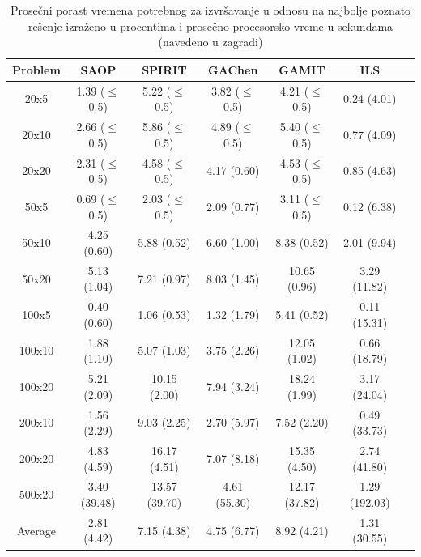 \documentclass[a4paper]{article}
\begin{document}
\begin{table}[H]
  \caption{Prosečni porast vremena potrebnog za izvršavanje u odnosu na najbolje poznato rešenje izraženo u procentima i prosečno procesorsko vreme u sekundama (navedeno u zagradi)
  \cite{aComprehensiveReviewAndEvaluationOfPermutationFlowshopHeuristics}}
  \label{tab:alg}
  \begin{center}
      \begin{adjustbox}{max width=1.0\linewidth,center}
   \begin{tabular}{c c c c c c c} 
   \hline
   Problem & SAOP & SPIRIT & GAChen & GAMIT & ILS &\\ [0.5ex] 
   \hline\hline
   20x5 & 1.39 ($\leq$0.5) & 5.22 ($\leq$0.5) & 3.82 ($\leq$0.5) & 4.21 ($\leq$0.5) & 0.24 (4.01) &\\ [1ex]
   \hline
   20x10 & 2.66 ($\leq$0.5) & 5.86 ($\leq$0.5) & 4.89 ($\leq$0.5) & 5.40 ($\leq$0.5) & 0.77 (4.09) &\\ [1ex]
   \hline
   20x20 & 2.31 ($\leq$0.5) & 4.58 ($\leq$0.5) & 4.17 (0.60) & 4.53 ($\leq$0.5) & 0.85 (4.63) &\\ [1ex]
   \hline
   50x5 & 0.69 ($\leq$0.5) & 2.03 ($\leq$0.5) & 2.09 (0.77) & 3.11 ($\leq$0.5) & 0.12 (6.38) &\\ [1ex]
   \hline
   50x10 & 4.25 (0.60) & 5.88 (0.52) & 6.60 (1.00) & 8.38 (0.52) & 2.01 (9.94) &\\ [1ex] 
   \hline
   50x20 & 5.13 (1.04) & 7.21 (0.97) & 8.03 (1.45) & 10.65 (0.96) & 3.29 (11.82) &\\ [1ex] 
   \hline
   100x5 & 0.40 (0.60) & 1.06 (0.53) & 1.32 (1.79) & 5.41 (0.52) & 0.11 (15.31) &\\ [1ex] 
   \hline
   100x10 & 1.88 (1.10) & 5.07 (1.03) & 3.75 (2.26) & 12.05 (1.02) & 0.66 (18.79) &\\ [1ex] 
   \hline
   100x20 & 5.21 (2.09) & 10.15 (2.00) & 7.94 (3.24) &18.24 (1.99) & 3.17 (24.04) &\\ [1ex] 
   \hline
   200x10 & 1.56 (2.29) & 9.03 (2.25) & 2.70 (5.97) & 7.52 (2.20) & 0.49 (33.73) &\\ [1ex] 
   \hline
   200x20 & 4.83 (4.59) & 16.17 (4.51) & 7.07 (8.18) & 15.35 (4.50) & 2.74 (41.80) &\\ [1ex] 
   \hline
   500x20 & 3.40 (39.48) & 13.57 (39.70) & 4.61 (55.30) & 12.17 (37.82) & 1.29 (192.03) &\\ [1ex] 
   \hline
   \hline
   Average & 2.81 (4.42) & 7.15 (4.38) & 4.75 (6.77) & 8.92 (4.21) & 1.31 (30.55) &\\ [1ex] 
   \hline
   \end{tabular}
  \end{adjustbox}
  \end{center}
  \end{table}
  
\end{document}
